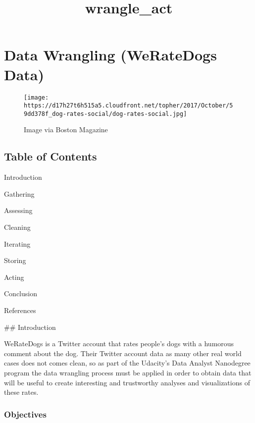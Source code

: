 \documentclass[11pt]{article}
\title{wrangle\_act}
\makeatletter
\def\maxwidth{\ifdim\Gin@nat@width>\linewidth\linewidth
    \else\Gin@nat@width\fi}
\let\Oldincludegraphics\includegraphics
\renewcommand{\includegraphics}[1]{\Oldincludegraphics[width=.8\maxwidth]{#1}}
\makeatother
\begin{document}
    
    
    \maketitle
    
    

    
    \section{Data Wrangling (WeRateDogs
Data)}\label{data-wrangling-weratedogs-data}

\begin{figure}
\centering
\texttt{[image: https://d17h27t6h515a5.cloudfront.net/topher/2017/October/59dd378f\_dog-rates-social/dog-rates-social.jpg]}
\caption{Image via Boston Magazine}
\end{figure}

\subsection{Table of Contents}\label{table-of-contents}

Introduction

Gathering

Assessing

Cleaning

Iterating

Storing

Acting

Conclusion

References

     \#\# Introduction

 WeRateDogs is a Twitter account that rates people's dogs with a
humorous comment about the dog. Their Twitter account data as many other
real world cases does not comes clean, so as part of the Udacity's Data
Analyst Nanodegree program the data wrangling process must be applied in
order to obtain data that will be useful to create interesting and
trustworthy analyses and visualizations of these rates.

\subsubsection{Objectives}\label{objectives}
\end{document}
